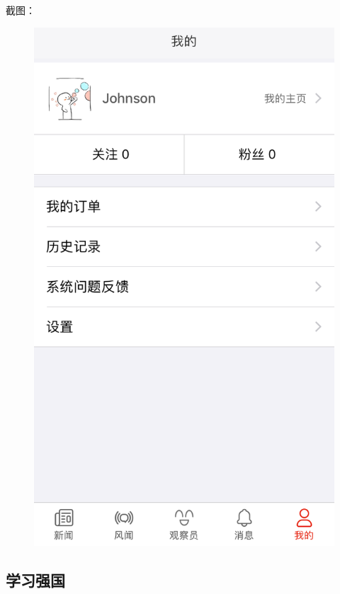 \documentclass{article}
\begin{document}
截图：
\begin{figure}[H]
    \centering
    \includegraphics[scale=0.28]{F2}
    \label{fig:F2}
\end{figure}

\subsection{学习强国}
\end{document}
